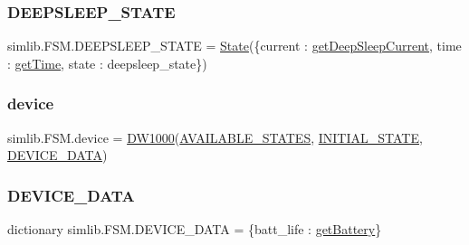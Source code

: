 \subsubsection{\texorpdfstring{D\+E\+E\+P\+S\+L\+E\+E\+P\+\_\+\+S\+T\+A\+TE}{DEEPSLEEP\_STATE}}
{\footnotesize\ttfamily simlib.\+F\+S\+M.\+D\+E\+E\+P\+S\+L\+E\+E\+P\+\_\+\+S\+T\+A\+TE = \mbox{\hyperlink{classsimlib_1_1_f_s_m_1_1_state}{State}}(\{\textquotesingle{}current\textquotesingle{} \+: \mbox{\hyperlink{namespacesimlib_1_1_f_s_m_a327a557b074384ce208b09d4ec807432}{get\+Deep\+Sleep\+Current}}, \textquotesingle{}time\textquotesingle{} \+: \mbox{\hyperlink{namespacesimlib_1_1_f_s_m_a11348c0ee93cab46de076fcf8ec8395f}{get\+Time}}, \textquotesingle{}state\textquotesingle{} \+: \textquotesingle{}deepsleep\+\_\+state\textquotesingle{}\})}

\mbox{\label{namespacesimlib_1_1_f_s_m_a73ed1e1b900ec529305fc53518fa0470}} 
\subsubsection{\texorpdfstring{device}{device}}
{\footnotesize\ttfamily simlib.\+F\+S\+M.\+device = \mbox{\hyperlink{classsimlib_1_1_f_s_m_1_1_d_w1000}{D\+W1000}}(\mbox{\hyperlink{namespacesimlib_1_1_f_s_m_a73284019a2ab444d9556c97e7fbecaec}{A\+V\+A\+I\+L\+A\+B\+L\+E\+\_\+\+S\+T\+A\+T\+ES}}, \mbox{\hyperlink{namespacesimlib_1_1_f_s_m_a370ea88f722b665e583624f9245c102a}{I\+N\+I\+T\+I\+A\+L\+\_\+\+S\+T\+A\+TE}}, \mbox{\hyperlink{namespacesimlib_1_1_f_s_m_acf009361a37b6f0f5041c0291e79e6cc}{D\+E\+V\+I\+C\+E\+\_\+\+D\+A\+TA}})}

\mbox{\label{namespacesimlib_1_1_f_s_m_acf009361a37b6f0f5041c0291e79e6cc}} 
\subsubsection{\texorpdfstring{D\+E\+V\+I\+C\+E\+\_\+\+D\+A\+TA}{DEVICE\_DATA}}
{\footnotesize\ttfamily dictionary simlib.\+F\+S\+M.\+D\+E\+V\+I\+C\+E\+\_\+\+D\+A\+TA = \{\textquotesingle{}batt\+\_\+life\textquotesingle{} \+: \mbox{\hyperlink{namespacesimlib_1_1_f_s_m_a61b3092e8c2bea57757c200b5cd1142d}{get\+Battery}}\}}

